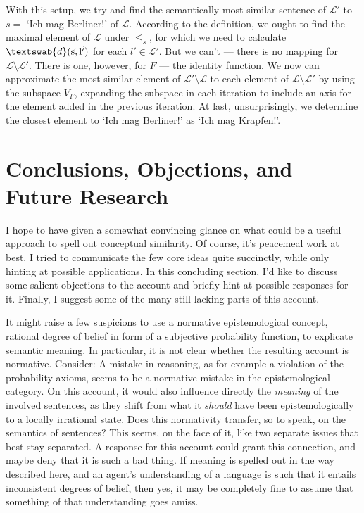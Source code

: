 \documentclass[11pt, a4paper]{scrartcl}
\renewcommand{\i}[1]{\emph{#1}}
\renewcommand{\L}{\mathcal{L}}
\renewcommand{\v}[1]{\vec{\mathrm{#1}}}
\newcommand{\m}[1]{\textswab{#1}}
\begin{document}
With this setup, we try and find the semantically most similar sentence of $\L'$ to $s =$ `Ich mag Berliner!' of $\L$. According to the definition, we ought to find the maximal element of $\L$ under $\leqslant_s$, for which we need to calculate $\m{d}(\v{s},\v{l'})$ for each $l' \in \L'$. But we can't --- there is no mapping for $\L\setminus\L'$. There is one, however, for $F$ --- the identity function. We now can approximate the most similar element of $\L'\setminus\L$ to each element of $\L\setminus\L'$ by using the subspace $V_F$, expanding the subspace in each iteration to include an axis for the element added in the previous iteration. At last, unsurprisingly, we determine the closest element to `Ich mag Berliner!' as `Ich mag Krapfen!'. 

\section{Conclusions, Objections, and Future Research}

I hope to have given a somewhat convincing glance on what could be a useful approach to spell out conceptual similarity. Of course, it's peacemeal work at best. I tried to communicate the few core ideas quite succinctly, while only hinting at possible applications. In this concluding section, I'd like to discuss some salient objections to the account and briefly hint at possible responses for it. Finally, I suggest some of the many still lacking parts of this account.

It might raise a few suspicions to use a normative epistemological concept, rational degree of belief in form of a subjective probability function, to explicate semantic meaning. In particular, it is not clear whether the resulting account is normative. Consider: A mistake in reasoning, as for example a violation of the probability axioms, seems to be a normative mistake in the epistemological category. On this account, it would also influence directly the \i{meaning} of the involved sentences, as they shift from what it \i{should} have been epistemologically to a locally irrational state. Does this normativity transfer, so to speak, on the semantics of sentences? This seems, on the face of it, like two separate issues that best stay separated. A response for this account could grant this connection, and maybe deny that it is such a bad thing. If meaning is spelled out in the way described here, and an agent's understanding of a language is such that it entails inconsistent degrees of belief, then yes, it may be completely fine to assume that something of that understanding goes amiss. 
\end{document}
